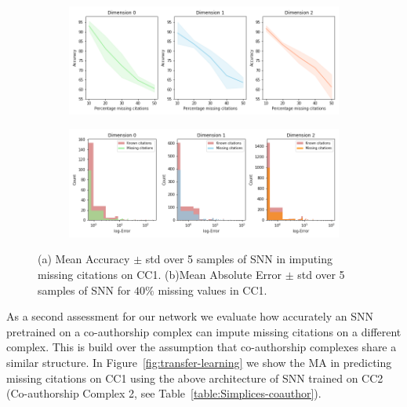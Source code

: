 \begin{figure}[tb]
\centering
 \begin{subfigure}[t]{-0.8\textwidth}
 \vspace{-4cm}
  \end{subfigure}
\begin{subfigure}[t]{0.8\textwidth}
\centering
   \includegraphics[scale=0.35]{./figures/accuracy_network1.png}
\end{subfigure}
 \begin{subfigure}[t]{0.8\textwidth}
  \end{subfigure}
\begin{subfigure}[t]{0.8\textwidth}
\centering
\vspace{-0.5cm}
   \includegraphics[scale=0.36]{./figures/Error_dist_start150250_seed6666_notsee40.png}
\end{subfigure}
\caption{(a) Mean Accuracy $\pm$ std over 5 samples of SNN in imputing missing citations on CC1. (b)Mean Absolute Error $\pm$ std over 5 samples of SNN for $40\%$ missing values in CC1. }
\label{fig:accuracy-error}
\end{figure}
As a second assessment for our network we evaluate how accurately an SNN pretrained on a co-authorship complex can impute missing citations on a different complex. This is build over the assumption that co-authorship complexes share a similar structure. In Figure~\ref{fig:transfer-learning} we show the MA in predicting missing citations on CC1 using the above architecture of SNN trained on CC2 (Co-authorship Complex 2, see Table~\ref{table:Simplices-coauthor}).
